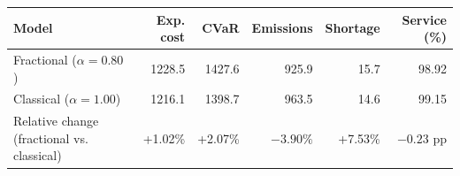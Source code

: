 \begin{tabular}{lrrrrr}
\toprule
Model & Exp. cost & CVaR & Emissions & Shortage & Service (\%) \\
\midrule
Fractional ($\alpha=0.80$) & 1228.5 & 1427.6 & 925.9 & 15.7 & 98.92 \\
Classical ($\alpha=1.00$) & 1216.1 & 1398.7 & 963.5 & 14.6 & 99.15 \\
Relative change (fractional vs. classical) & +1.02\% & +2.07\% & $-3.90\%$ & +7.53\% & $-0.23$ pp \\
\bottomrule
\end{tabular}
